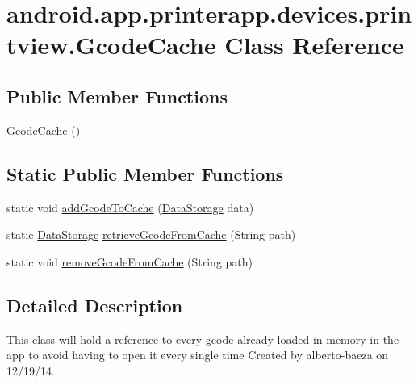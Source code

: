 \hypertarget{classandroid_1_1app_1_1printerapp_1_1devices_1_1printview_1_1_gcode_cache}{}\section{android.\+app.\+printerapp.\+devices.\+printview.\+Gcode\+Cache Class Reference}
\label{classandroid_1_1app_1_1printerapp_1_1devices_1_1printview_1_1_gcode_cache}
\subsection*{Public Member Functions}
\begin{DoxyCompactItemize}
\item 
\hyperlink{classandroid_1_1app_1_1printerapp_1_1devices_1_1printview_1_1_gcode_cache_ac45daaae1d74878622b9282bc68a85eb}{Gcode\+Cache} ()
\end{DoxyCompactItemize}
\subsection*{Static Public Member Functions}
\begin{DoxyCompactItemize}
\item 
static void \hyperlink{classandroid_1_1app_1_1printerapp_1_1devices_1_1printview_1_1_gcode_cache_adc03c1d6439082d4673d3c2bd905bebd}{add\+Gcode\+To\+Cache} (\hyperlink{classandroid_1_1app_1_1printerapp_1_1viewer_1_1_data_storage}{Data\+Storage} data)
\item 
static \hyperlink{classandroid_1_1app_1_1printerapp_1_1viewer_1_1_data_storage}{Data\+Storage} \hyperlink{classandroid_1_1app_1_1printerapp_1_1devices_1_1printview_1_1_gcode_cache_a293ac4540a4381abbc496eef01e47b35}{retrieve\+Gcode\+From\+Cache} (String path)
\item 
static void \hyperlink{classandroid_1_1app_1_1printerapp_1_1devices_1_1printview_1_1_gcode_cache_ab99f52ccd9cdd7fd2cd819dd65c6c7a8}{remove\+Gcode\+From\+Cache} (String path)
\end{DoxyCompactItemize}


\subsection{Detailed Description}
This class will hold a reference to every gcode already loaded in memory in the app to avoid having to open it every single time Created by alberto-\/baeza on 12/19/14. 

